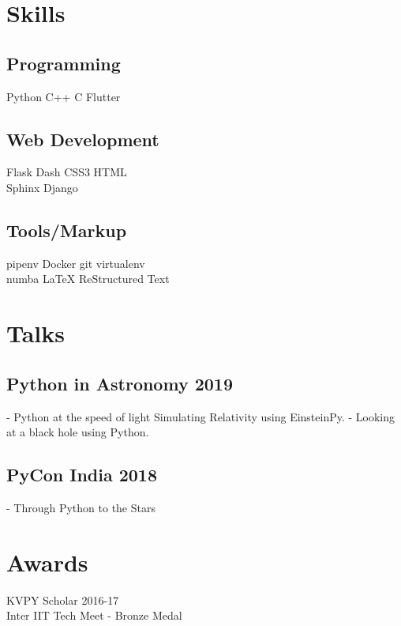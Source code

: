 \documentclass[a4paper]{deedy-resume-openfont}
\begin{document}
\begin{minipage}[t]{0.33\textwidth}

\section{Skills}
\subsection{Programming}
Python \textbullet{}  C++ \textbullet{} C \textbullet{}
Flutter \\ 
\subsection{Web Development}
Flask \textbullet{}  Dash \textbullet{} CSS3 \textbullet{} HTML\\
Sphinx \textbullet{} Django\\
\subsection{Tools/Markup}
pipenv  \textbullet{} Docker\textbullet{} 
git \textbullet{}  virtualenv \\  numba \textbullet{} \textbullet{}
\LaTeX \textbullet{} ReStructured Text \\

\section{Talks} 

\subsection{Python in Astronomy 2019}
- Python at the speed of light Simulating Relativity using EinsteinPy.
- Looking at a black hole using Python. 

\subsection{PyCon India 2018}
- Through Python to the Stars



\section{Awards}
KVPY Scholar 2016-17\\
Inter IIT Tech Meet - Bronze Medal\\



\end{minipage}
\end{document}
